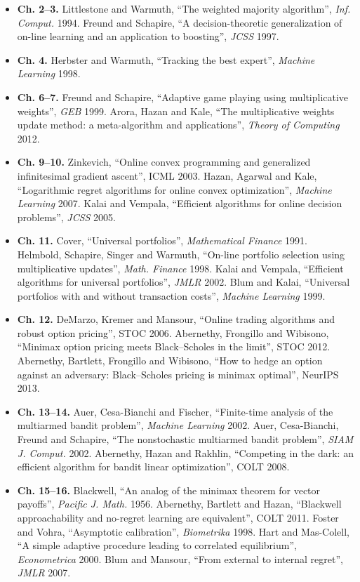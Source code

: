 \documentclass[11pt,a4paper,openany]{book}
\begin{document}
\begin{itemize}
\item \textbf{Ch. 2–3.} Littlestone and Warmuth, ``The weighted majority algorithm'', \emph{Inf. Comput.} 1994. Freund and Schapire, ``A decision-theoretic generalization of on-line learning and an application to boosting'', \emph{JCSS} 1997.
\item \textbf{Ch. 4.} Herbster and Warmuth, ``Tracking the best expert'', \emph{Machine Learning} 1998.
\item \textbf{Ch. 6–7.} Freund and Schapire, ``Adaptive game playing using multiplicative weights'', \emph{GEB} 1999. Arora, Hazan and Kale, ``The multiplicative weights update method: a meta-algorithm and applications'', \emph{Theory of Computing} 2012.
\item \textbf{Ch. 9–10.} Zinkevich, ``Online convex programming and generalized infinitesimal gradient ascent'', ICML 2003. Hazan, Agarwal and Kale, ``Logarithmic regret algorithms for online convex optimization'', \emph{Machine Learning} 2007. Kalai and Vempala, ``Efficient algorithms for online decision problems'', \emph{JCSS} 2005.
\item \textbf{Ch. 11.} Cover, ``Universal portfolios'', \emph{Mathematical Finance} 1991. Helmbold, Schapire, Singer and Warmuth, ``On-line portfolio selection using multiplicative updates'', \emph{Math. Finance} 1998. Kalai and Vempala, ``Efficient algorithms for universal portfolios'', \emph{JMLR} 2002. Blum and Kalai, ``Universal portfolios with and without transaction costs'', \emph{Machine Learning} 1999.
\item \textbf{Ch. 12.} DeMarzo, Kremer and Mansour, ``Online trading algorithms and robust option pricing'', STOC 2006. Abernethy, Frongillo and Wibisono, ``Minimax option pricing meets Black–Scholes in the limit'', STOC 2012. Abernethy, Bartlett, Frongillo and Wibisono, ``How to hedge an option against an adversary: Black–Scholes pricing is minimax optimal'', NeurIPS 2013.
\item \textbf{Ch. 13–14.} Auer, Cesa-Bianchi and Fischer, ``Finite-time analysis of the multiarmed bandit problem'', \emph{Machine Learning} 2002. Auer, Cesa-Bianchi, Freund and Schapire, ``The nonstochastic multiarmed bandit problem'', \emph{SIAM J. Comput.} 2002. Abernethy, Hazan and Rakhlin, ``Competing in the dark: an efficient algorithm for bandit linear optimization'', COLT 2008.
\item \textbf{Ch. 15–16.} Blackwell, ``An analog of the minimax theorem for vector payoffs'', \emph{Pacific J. Math.} 1956. Abernethy, Bartlett and Hazan, ``Blackwell approachability and no-regret learning are equivalent'', COLT 2011. Foster and Vohra, ``Asymptotic calibration'', \emph{Biometrika} 1998. Hart and Mas-Colell, ``A simple adaptive procedure leading to correlated equilibrium'', \emph{Econometrica} 2000. Blum and Mansour, ``From external to internal regret'', \emph{JMLR} 2007.

\end{itemize}
\end{document}

